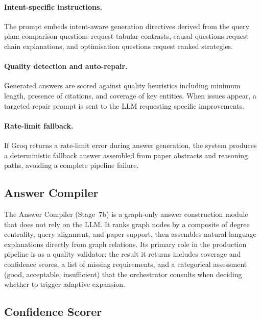\documentclass[11pt,a4paper]{article}
\begin{document}
\paragraph{Intent-specific instructions.}
The prompt embeds intent-aware generation directives derived from the query
plan: comparison questions request tabular contrasts, causal questions
request chain explanations, and optimisation questions request ranked
strategies.

\paragraph{Quality detection and auto-repair.}
Generated answers are scored against quality heuristics including minimum
length, presence of citations, and coverage of key entities. When issues
appear, a targeted repair prompt is sent to the LLM requesting specific
improvements.

\paragraph{Rate-limit fallback.}
If Groq returns a rate-limit error during answer generation, the system
produces a deterministic fallback answer assembled from paper abstracts and
reasoning paths, avoiding a complete pipeline failure.

\subsection{Answer Compiler}

The Answer Compiler (Stage~7b) is a graph-only answer construction module
that does not rely on the LLM. It ranks graph nodes by a composite of
degree centrality, query alignment, and paper support, then assembles
natural-language explanations directly from graph relations. Its primary
role in the production pipeline is as a quality validator: the result it
returns includes coverage and confidence scores, a list of missing
requirements, and a categorical assessment (good, acceptable, insufficient)
that the orchestrator consults when deciding whether to trigger adaptive
expansion.

\subsection{Confidence Scorer}
\end{document}
